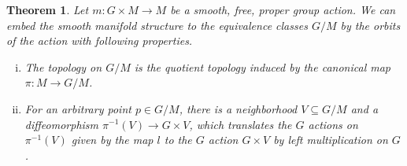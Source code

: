 \documentclass{article}
\newtheorem{theorem}{Theorem}[section]
\numberwithin{equation}{section}
\begin{document}
\begin{theorem}
Let $m:G\times M\to M$ be a smooth, free, proper group action. We can embed the smooth manifold structure to  the equivalence classes $G/M$ by the orbits of the action with following properties.
\begin{enumerate}[i).]
\item The topology on $G/M$ is the quotient topology induced by the canonical map $\pi:M\to G/M$.
\item For an arbitrary point $p\in G/M$, there is a neighborhood $V\subseteq G/M$ and a diffeomorphism $\pi^{-1}(V)\to G\times V$, which translates the $G$ actions on $\pi^{-1}(V)$ given by the map $l$ to the $G$ action $G\times V$ by left multiplication on $G$.%
\end{enumerate}
\end{theorem}
\end{document}
